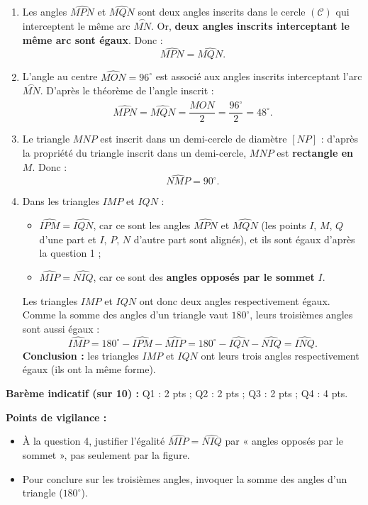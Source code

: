 \documentclass[11pt]{article}
\begin{document}
\begin{corrige}
\begin{enumerate}
\item Les angles $\widehat{MPN}$ et $\widehat{MQN}$ sont deux angles inscrits dans le cercle $(\mathcal{C})$ qui interceptent le même arc $\overset{\frown}{MN}$. Or, \textbf{deux angles inscrits interceptant le même arc sont égaux}. Donc :
\[ \widehat{MPN} = \widehat{MQN}. \]
\item L'angle au centre $\widehat{MON} = 96^{\circ}$ est associé aux angles inscrits interceptant l'arc $\overset{\frown}{MN}$. D'après le théorème de l'angle inscrit :
\[ \widehat{MPN} = \widehat{MQN} = \frac{\widehat{MON}}{2} = \frac{96^{\circ}}{2} = 48^{\circ}. \]
\item Le triangle $MNP$ est inscrit dans un demi-cercle de diamètre $[NP]$ : d'après la propriété du triangle inscrit dans un demi-cercle, $MNP$ est \textbf{rectangle en $M$}. Donc :
\[ \widehat{NMP} = 90^{\circ}. \]
\item Dans les triangles $IMP$ et $IQN$ :
\begin{itemize}
\item $\widehat{IPM} = \widehat{IQN}$, car ce sont les angles $\widehat{MPN}$ et $\widehat{MQN}$ (les points $I$, $M$, $Q$ d'une part et $I$, $P$, $N$ d'autre part sont alignés), et ils sont égaux d'après la question 1 ;
\item $\widehat{MIP} = \widehat{NIQ}$, car ce sont des \textbf{angles opposés par le sommet} $I$.
\end{itemize}
Les triangles $IMP$ et $IQN$ ont donc deux angles respectivement égaux. Comme la somme des angles d'un triangle vaut $180^{\circ}$, leurs troisièmes angles sont aussi égaux :
\[ \widehat{IMP} = 180^{\circ} - \widehat{IPM} - \widehat{MIP} = 180^{\circ} - \widehat{IQN} - \widehat{NIQ} = \widehat{INQ}. \]
\textbf{Conclusion :} les triangles $IMP$ et $IQN$ ont leurs trois angles respectivement égaux (ils ont la même forme).
\end{enumerate}
\textbf{Barème indicatif (sur 10) :} Q1 : 2 pts ; Q2 : 2 pts ; Q3 : 2 pts ; Q4 : 4 pts.

\textbf{Points de vigilance :}
\begin{itemize}
\item À la question 4, justifier l'égalité $\widehat{MIP} = \widehat{NIQ}$ par « angles opposés par le sommet », pas seulement par la figure.
\item Pour conclure sur les troisièmes angles, invoquer la somme des angles d'un triangle ($180^{\circ}$).
\end{itemize}
\end{corrige}
\end{document}
